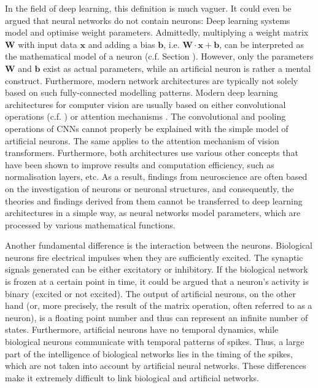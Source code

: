 In the field of deep learning, this definition is much vaguer. It could even be argued that neural networks do not contain neurons: Deep learning systems model and optimise weight parameters. Admittedly, multiplying a weight matrix $\boldsymbol{W}$ with input data $\boldsymbol{x}$ and adding a bias $\boldsymbol{b}$, i.e. $\boldsymbol{W} \cdot \boldsymbol{x} + \boldsymbol{b}$, can be interpreted as the mathematical model of a neuron (c.f. Section ).
However, only the parameters $\boldsymbol{W}$ and $\boldsymbol{b}$ exist as actual parameters, while an artificial neuron is rather a mental construct.
Furthermore, modern network architectures are typically not solely based on such fully-connected modelling patterns.
Modern deep learning architectures for computer vision are usually based on either convolutional operations (c.f. ) or attention mechanisms .
The convolutional and pooling operations of CNNs cannot properly be explained with the simple model of artificial neurons.
The same applies to the attention mechanism of vision transformers. Furthermore, both architectures use various other concepts that have been shown to improve results and computation efficiency, such as normalisation layers, etc.
As a result, findings from neuroscience are often based on the investigation of neurons or neuronal structures, and consequently, the theories and findings derived from them cannot be transferred to deep learning architectures in a simple way, as neural networks model parameters, which are processed by various mathematical functions.

Another fundamental difference is the interaction between the neurons. Biological neurons fire electrical impulses when they are sufficiently excited. The synaptic signals generated can be either excitatory or inhibitory. If the biological network is frozen at a certain point in time, it could be argued that a neuron's activity is binary (excited or not excited).
The output of artificial neurons, on the other hand (or, more precisely, the result of the matrix operation, often referred to as a neuron), is a floating point number and thus can represent an infinite number of states. Furthermore, artificial neurons have no temporal dynamics, while biological neurons communicate with temporal patterns of spikes. Thus, a large part of the intelligence of biological networks lies in the timing of the spikes, which are not taken into account by artificial neural networks. These differences make it extremely difficult to link biological and artificial networks.

